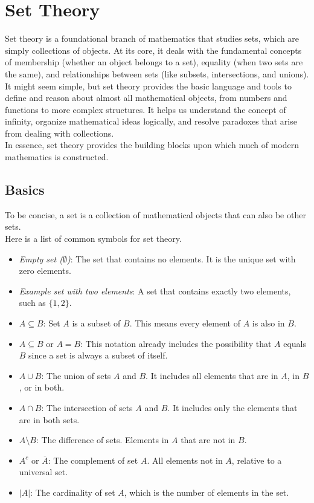 \newpage
\section{Set Theory}
Set theory is a foundational branch of mathematics that studies sets, which are simply collections of objects. At its core, it deals with the fundamental concepts of membership (whether an object belongs to a set), equality (when two sets are the same), and relationships between sets (like subsets, intersections, and unions).\\
It might seem simple, but set theory provides the basic language and tools to define and reason about almost all mathematical objects, from numbers and functions to more complex structures. It helps us understand the concept of infinity, organize mathematical ideas logically, and resolve paradoxes that arise from dealing with collections.\\
In essence, set theory provides the building blocks upon which much of modern mathematics is constructed.

\subsection{Basics}
To be concise, a set is a collection of mathematical objects that can also be other sets.\\
Here is a list of common symbols for set theory.

\begin{itemize}[label=\(-\)]
	\item \emph{Empty set (\(\emptyset\))}: The set that contains no elements. It is the unique set with zero elements.

	\item \emph{Example set with two elements}: A set that contains exactly two elements, such as \(\{1, 2\}\).

	\item \(A \subseteq B\): Set \(A\) is a subset of \(B\). This means every element of \(A\) is also in \(B\).

	\item \(A \subseteq B\) or \(A = B\): This notation already includes the possibility that \(A\) equals \(B\) since a set is always a subset of itself.

	\item \(A \cup B\): The union of sets \(A\) and \(B\). It includes all elements that are in \(A\), in \(B\), or in both.

	\item \(A \cap B\): The intersection of sets \(A\) and \(B\). It includes only the elements that are in both sets.

	\item \(A \setminus B\): The difference of sets. Elements in \(A\) that are not in \(B\).

	\item \(A^c\) or \(\overline{A}\): The complement of set \(A\). All elements not in \(A\), relative to a universal set.

	\item \(|A|\): The cardinality of set \(A\), which is the number of elements in the set.
\end{itemize}

